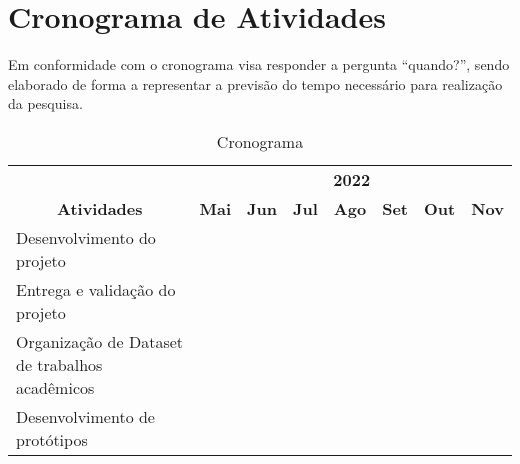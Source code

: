 \section{Cronograma de Atividades} \label{sec:schedule_activities_table}

Em conformidade com \citep[p. 128]{LAKATOS2021:metodologia} o cronograma
visa responder a pergunta “quando?”, sendo elaborado de forma a
representar a previsão do tempo necessário para realização da pesquisa.

\begin{table}[H]
    \caption{Cronograma}
    \begin{tabular}{|p{7cm}|l|l|l|l|l|l|l|}
        \hline
        \multicolumn{1}{|c|}{}                                      & \multicolumn{7}{c|}{\textbf{2022}}                                                                                                                                                                   \\ \cline{2-8}
        \multicolumn{1}{|c|}{\multirow{-2}{*}{\textbf{Atividades}}} & \textbf{Mai}                       & \textbf{Jun}             & \textbf{Jul}             & \textbf{Ago}             & \textbf{Set}             & \textbf{Out}             & \textbf{Nov}             \\ \hline
        Desenvolvimento do projeto                                  & \cellcolor[HTML]{000000}           & \cellcolor[HTML]{000000} &                          &                          &                          &                          &                          \\ \hline
        Entrega e validação do projeto                              &                                    & \cellcolor[HTML]{000000} & \cellcolor[HTML]{C0C0C0} &                          &                          &                          &                          \\ \hline
        Organização de Dataset de trabalhos acadêmicos              &                                    &                          & \cellcolor[HTML]{C0C0C0} &                          &                          &                          &                          \\ \hline
        Desenvolvimento de protótipos                               &                                    &                          & \cellcolor[HTML]{C0C0C0} & \cellcolor[HTML]{C0C0C0} &                          &                          &                          \\ \hline

\end{tabular}
\end{table}
